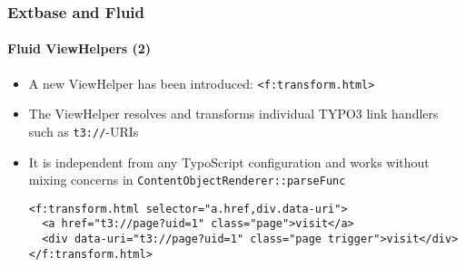%

\begin{frame}[fragile]
	\frametitle{Extbase and Fluid}
	\framesubtitle{Fluid ViewHelpers (2)}


	\begin{itemize}
		\item A new ViewHelper has been introduced:\newline
			\small\texttt{<f:transform.html>}\normalsize
		\item The ViewHelper resolves and transforms individual TYPO3 link handlers
			such as \texttt{t3://}-URIs
		\item It is independent from any TypoScript configuration and works
			without mixing concerns in \small\texttt{ContentObjectRenderer::parseFunc}
\begin{lstlisting}
<f:transform.html selector="a.href,div.data-uri">
  <a href="t3://page?uid=1" class="page">visit</a>
  <div data-uri="t3://page?uid=1" class="page trigger">visit</div>
</f:transform.html>
\end{lstlisting}
	\end{itemize}

\end{frame}

